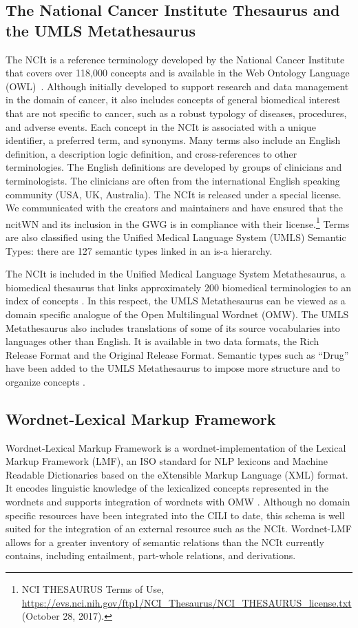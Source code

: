 \documentclass[11pt]{article}
\begin{document}
\subsection{The National Cancer Institute Thesaurus and the UMLS Metathesaurus}
The NCIt is a reference terminology developed by the National Cancer Institute that covers over 118,000 concepts and is available in the Web Ontology Language (OWL)~\citep{sioutos2007nci}. Although initially developed to support research and data management in the domain of cancer, it also includes concepts of general biomedical interest that are not specific to cancer, such as a robust typology of diseases, procedures, and adverse events. Each concept in the NCIt is associated with a unique identifier, a preferred term, and synonyms. Many terms also include an English definition, a description logic definition, and cross-references to other terminologies. The English definitions are developed by groups of clinicians and terminologists. The clinicians are often from the international English speaking community (USA, UK, Australia). The NCIt is released under a special license. We communicated with the creators and maintainers and have ensured that the ncitWN and its inclusion in the GWG is in compliance with their license.\footnote{NCI THESAURUS Terms of Use, \url{https://evs.nci.nih.gov/ftp1/NCI_Thesaurus/NCI_THESAURUS_license.txt} (October 28, 2017).} Terms are also classified using the  Unified Medical Language System (UMLS) Semantic Types: there are 127 semantic types linked in an is-a hierarchy. 

The NCIt is included in the Unified Medical Language System Metathesaurus, a biomedical thesaurus that links approximately 200 biomedical terminologies to an index of concepts \citep{schuyler1993umls}. In this respect, the UMLS Metathesaurus can be viewed as a domain specific analogue of the Open Multilingual Wordnet (OMW). The UMLS Metathesaurus also includes translations of some of its source vocabularies into languages other than English. It is available in two data formats, the Rich Release Format and the Original Release Format. Semantic types such as ``Drug'' have been added to the UMLS Metathesaurus to impose more structure and to organize concepts \citep{NLM:2009}.

\subsection{Wordnet-Lexical Markup Framework}
Wordnet-Lexical Markup Framework is a wordnet-implementation of the Lexical Markup Framework \citep{francopoulo2006lexical} (LMF), an ISO standard for NLP lexicons and Machine Readable Dictionaries based on the eXtensible Markup Language (XML) format. It encodes linguistic knowledge of the lexicalized concepts represented in the wordnets and supports integration of wordnets with OMW \citep{da2015omwedit,Vossen:2013b,Bond:Foster:2013}. Although no domain specific resources have been integrated into the CILI to date, this schema is well suited for the integration of an external resource such as the NCIt. 
Wordnet-LMF allows for a greater inventory of semantic relations than the NCIt currently contains, including entailment, part-whole relations, and derivations.
\end{document}

